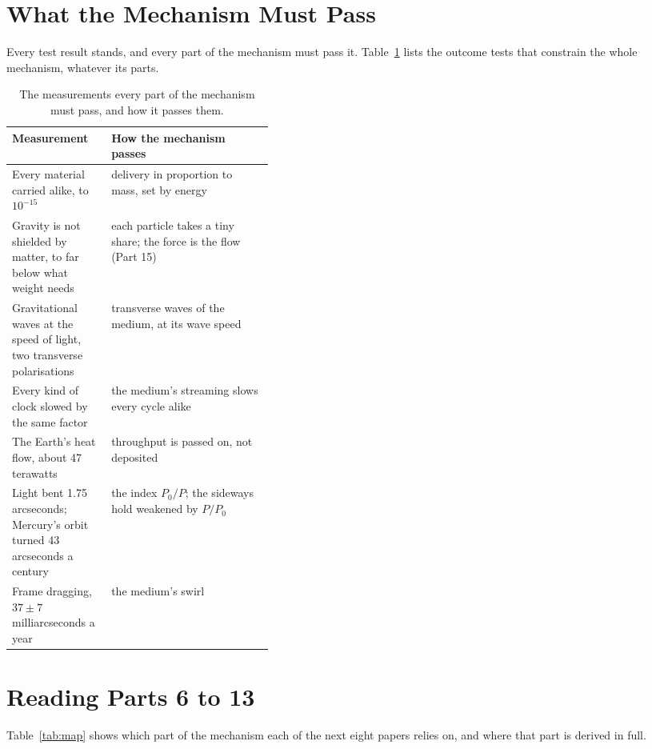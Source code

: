 \section{What the Mechanism Must Pass}

 Every test result stands, and every part of the mechanism must pass it. Table~\ref{tab:pass} lists the outcome tests that constrain the whole mechanism, whatever its parts.

\begin{table}[t]\centering\small
\caption{The measurements every part of the mechanism must pass, and how it passes them.}
\begin{tabularx}{\linewidth}{@{}>{\raggedright}p{0.38\linewidth} X@{}}\toprule
\textbf{Measurement} & \textbf{How the mechanism passes}\\\midrule
Every material carried alike, to $10^{-15}$ \citep{touboul2022} & delivery in proportion to mass, set by energy\\
Gravity is not shielded by matter, to far below what weight needs & each particle takes a tiny share; the force is the flow (Part 15)\\
Gravitational waves at the speed of light, two transverse polarisations \citep{abbott2017speed} & transverse waves of the medium, at its wave speed\\
Every kind of clock slowed by the same factor \citep{chou2010,bailey1977} & the medium's streaming slows every cycle alike\\
The Earth's heat flow, about 47 terawatts & throughput is passed on, not deposited\\
Light bent 1.75 arcseconds; Mercury's orbit turned 43 arcseconds a century & the index $P_0/P$; the sideways hold weakened by $P/P_0$\\
Frame dragging, $37\pm7$ milliarcseconds a year \citep{everitt2011} & the medium's swirl\\\bottomrule
\end{tabularx}\label{tab:pass}\end{table}

\section{Reading Parts 6 to 13}

Table~\ref{tab:map} shows which part of the mechanism each of the next eight papers relies on, and where that part is derived in full.

